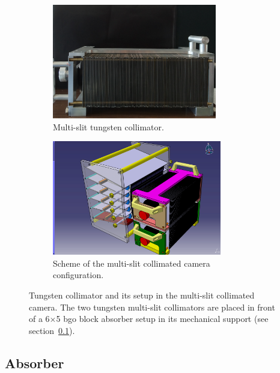 \begin{figure}
\begin{subfigure}[t]{.5\textwidth}
\centering
\includegraphics[width=\linewidth, trim={0 0 0 0.5cm},clip = true, height = 5cm]{03_GraphicFiles/chapter3_CLaRySproto/Collimator/Collimator.pdf}
\caption{Multi-slit tungsten collimator.}
\label{chap3::fig::collimatorPicture}
\end{subfigure}
\begin{subfigure}[t]{.5\textwidth}
\centering
\includegraphics[width=\linewidth, trim={3cm 0 0 0},clip = true, height = 5cm]{03_GraphicFiles/chapter3_CLaRySproto/schemes/AbsoberCollimator.jpg}
\caption{Scheme of the multi-slit collimated camera configuration.}
\label{chap3::fig::collimatorScheme}
\end{subfigure}
\caption{Tungsten collimator and its setup in the multi-slit collimated camera. The two tungsten multi-slit collimators are placed in front of a 6$\times$5 \gls{bgo} block absorber setup in its mechanical support (see section~\ref{chap3::subsec::absorber}).}
\label{chap3::fig::collimatorFig}
\end{figure} 



\subsection{Absorber}\label{chap3::subsec::absorber}

